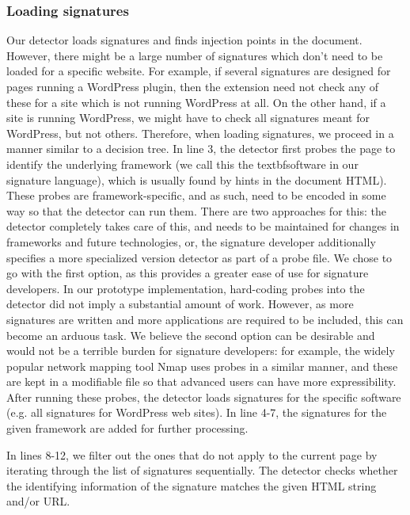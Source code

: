 \subsubsection{Loading signatures}
Our detector loads signatures and finds injection points in the document. However, there might be a large number of signatures which don't need to be loaded for a specific website. For example, if several signatures are designed for pages running a WordPress plugin, then the extension need not check any of these for a site which is not running WordPress at all. On the other hand, if a site is running WordPress, we might have to check all signatures meant for WordPress, but not others. Therefore, when loading signatures, we proceed in a manner similar to a decision tree. In line 3, the detector first probes the page to identify the underlying framework (we call this the textbf{software} in our signature language), which is usually found by hints in the document HTML). These probes are framework-specific, and as such, need to be encoded in some way so that the detector can run them. There are two approaches for this: the detector completely takes care of this, and needs to be maintained for changes in frameworks and future technologies, or, the signature developer additionally specifies a more specialized version detector as part of a probe file. We chose to go with the first option, as this provides a greater ease of use for signature developers. In our prototype implementation, hard-coding probes into the detector did not imply a substantial amount of work. However, as more signatures are written and more applications are required to be included, this can become an arduous task. We believe the second option can be desirable and would not be a terrible burden for signature developers: for example, the widely popular network mapping tool Nmap \cite{nMap} uses probes in a similar manner, and these are kept in a modifiable file so that advanced users can have more expressibility. After running these probes, the detector loads signatures for the specific software (e.g. all signatures for WordPress web sites). In line 4-7, the signatures for the given framework are added for further processing.

In lines 8-12, we filter out the ones that do not apply to the current page by iterating through the list of signatures sequentially. The detector checks whether the identifying information of the signature matches the given HTML string and/or URL.

